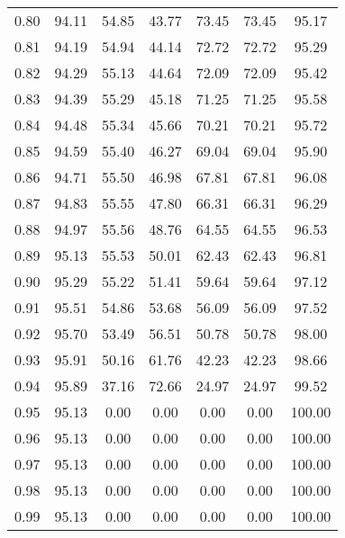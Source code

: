\begin{tabular}{|c|c|c|c|c|c|c|}
      0.80 &     94.11 &     54.85 &      43.77 &   73.45 &      73.45 &         95.17 \\
      0.81 &     94.19 &     54.94 &      44.14 &   72.72 &      72.72 &         95.29 \\
      0.82 &     94.29 &     55.13 &      44.64 &   72.09 &      72.09 &         95.42 \\
      0.83 &     94.39 &     55.29 &      45.18 &   71.25 &      71.25 &         95.58 \\
      0.84 &     94.48 &     55.34 &      45.66 &   70.21 &      70.21 &         95.72 \\
      0.85 &     94.59 &     55.40 &      46.27 &   69.04 &      69.04 &         95.90 \\
      0.86 &     94.71 &     55.50 &      46.98 &   67.81 &      67.81 &         96.08 \\
      0.87 &     94.83 &     55.55 &      47.80 &   66.31 &      66.31 &         96.29 \\
      0.88 &     94.97 &     55.56 &      48.76 &   64.55 &      64.55 &         96.53 \\
      0.89 &     95.13 &     55.53 &      50.01 &   62.43 &      62.43 &         96.81 \\
      0.90 &     95.29 &     55.22 &      51.41 &   59.64 &      59.64 &         97.12 \\
      0.91 &     95.51 &     54.86 &      53.68 &   56.09 &      56.09 &         97.52 \\
      0.92 &     95.70 &     53.49 &      56.51 &   50.78 &      50.78 &         98.00 \\
      0.93 &     95.91 &     50.16 &      61.76 &   42.23 &      42.23 &         98.66 \\
      0.94 &     95.89 &     37.16 &      72.66 &   24.97 &      24.97 &         99.52 \\
      0.95 &     95.13 &      0.00 &       0.00 &    0.00 &       0.00 &        100.00 \\
      0.96 &     95.13 &      0.00 &       0.00 &    0.00 &       0.00 &        100.00 \\
      0.97 &     95.13 &      0.00 &       0.00 &    0.00 &       0.00 &        100.00 \\
      0.98 &     95.13 &      0.00 &       0.00 &    0.00 &       0.00 &        100.00 \\
      0.99 &     95.13 &      0.00 &       0.00 &    0.00 &       0.00 &        100.00 \\
\bottomrule
\end{tabular}
